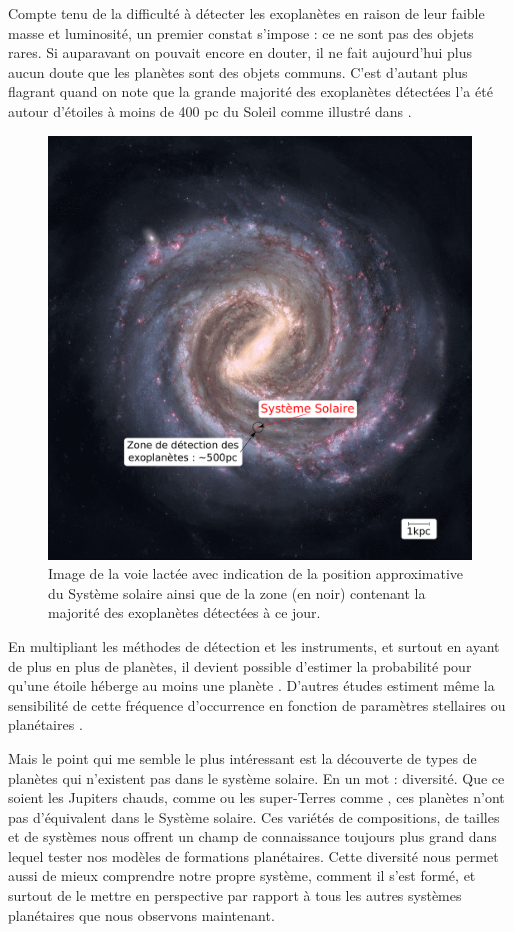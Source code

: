 Compte tenu de la difficulté à détecter les exoplanètes en raison de leur faible masse et luminosité, un premier constat
s'impose : ce ne sont pas des objets rares. Si auparavant on pouvait encore en douter, il ne fait aujourd'hui plus aucun doute
que les planètes sont des objets communs. C'est d'autant plus flagrant quand on note que la grande majorité des exoplanètes
détectées l'a été autour d'étoiles à moins de 400 pc du Soleil comme illustré dans . 

\begin{figure}[htbp]
\centering
\includegraphics[width=0.45\linewidth]{figure/milky_way_exoplanets.pdf}
\caption[Sphère de détection des exoplanètes par rapport à la Voie Lactée]{Image de la voie lactée avec indication de la
position approximative du Système solaire ainsi que de la zone (en noir) contenant la majorité des exoplanètes détectées à ce
jour.}\label{fig:milky_way_exoplanet}
\end{figure}


En multipliant les méthodes de détection et les instruments, et surtout en ayant de plus en plus de planètes, il devient
possible d'estimer la probabilité pour qu'une étoile héberge au moins une planète \citep{mayor2011road}. D'autres études
estiment même la sensibilité de cette fréquence d'occurrence en fonction de paramètres stellaires \citep{fischer2005planet,
johnson2007new, howard2012occurrence} ou planétaires \citep{mayor2011road, howard2010occurrence}. 

Mais le point qui me semble le plus intéressant est la découverte de types de planètes qui n'existent pas dans le système
solaire. En un mot : diversité. Que ce soient les Jupiters chauds, comme  ou les super-Terres comme
, ces planètes n'ont pas d'équivalent dans le Système solaire. Ces variétés de compositions, de tailles et de
systèmes nous offrent un champ de connaissance toujours plus grand dans lequel tester nos modèles de formations planétaires.
Cette diversité nous permet aussi de mieux comprendre notre propre système, comment il s'est formé, et surtout de le mettre
en perspective par rapport à tous les autres systèmes planétaires que nous observons maintenant.

